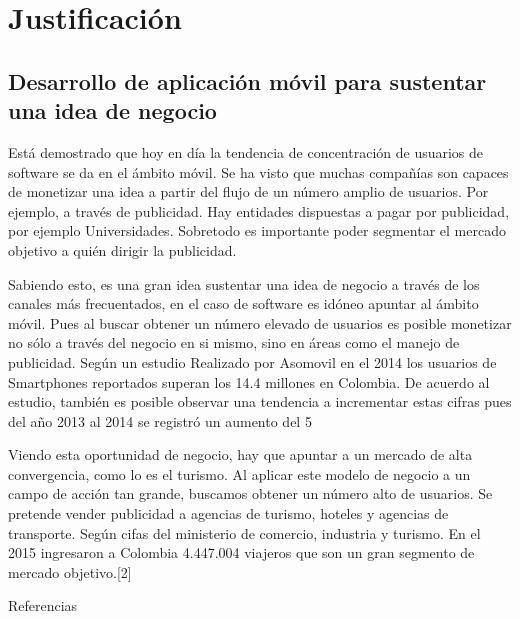 \chapter{Justificación}

\label{ch:background}

\section{Desarrollo de aplicación móvil para sustentar una idea de negocio}

Está demostrado que hoy en día la tendencia de concentración de usuarios de software se da en el ámbito móvil. Se ha visto que muchas compañías son capaces de monetizar una idea a partir del flujo de un número amplio de usuarios. Por ejemplo, a través de publicidad. Hay entidades dispuestas a pagar por publicidad, por ejemplo Universidades. Sobretodo es importante poder segmentar el mercado objetivo a quién dirigir la publicidad.

Sabiendo esto, es una gran idea sustentar una idea de negocio a través de los canales más frecuentados, en el caso de software es idóneo apuntar al ámbito móvil. Pues al buscar obtener un número elevado de usuarios es posible monetizar no sólo a través del negocio en si mismo, sino en áreas como el manejo de publicidad. Según un estudio Realizado por Asomovil en el 2014 los usuarios de Smartphones reportados superan los 14.4 millones en Colombia. De acuerdo al estudio, también es posible observar una tendencia a incrementar estas cifras pues del año 2013 al 2014 se registró un aumento del   5%

Viendo esta oportunidad de negocio, hay que apuntar a un mercado de alta convergencia, como lo es el turismo. Al aplicar este modelo de negocio a un campo de acción tan grande, buscamos obtener un número alto de usuarios. Se pretende vender publicidad a agencias de turismo, hoteles y agencias de transporte. Según cifas del ministerio de comercio, industria y turismo. En el 2015 ingresaron a Colombia 4.447.004 viajeros que son un gran segmento de mercado objetivo.[2]


Referencias



